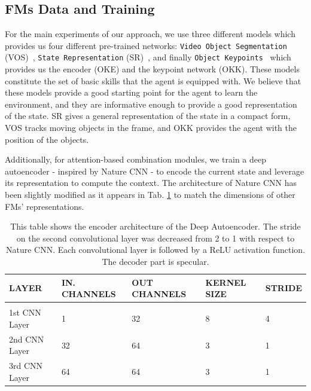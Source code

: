 \subsection{FMs Data and Training}
For the main experiments of our approach, we use three different models which provides us four different pre-trained networks: \texttt{Video Object Segmentation} (VOS)~\citep{goel2018unsupervised}, \texttt{State Representation} (SR)~\citep{anand2019unsupervised}, and finally \texttt{Object Keypoints}~\citep{kulkarni2019unsupervised} which provides us the encoder (OKE) and the keypoint network (OKK).
These models constitute the set of basic skills that the agent is equipped with.
We believe that these models provide a good starting point for the agent to learn the environment, and they are informative enough to provide a good representation of the state.
SR gives a general representation of the state in a compact form, VOS tracks moving objects in the frame, and OKK provides the agent with the position of the objects.

Additionally, for attention-based combination modules, we train a deep autoencoder - inspired by Nature CNN \citep{mnih2015human} - to encode the current state and leverage its representation to compute the context.
The architecture of Nature CNN has been slightly modified as it appears in Tab. \ref{tab:nature_cnn} to
match the dimensions of other FMs' representations.

 \begin{table}[htbp]
     \begin{center}
         \begin{tabular}{lllll}
             \multicolumn{1}{l}{LAYER}  &\multicolumn{1}{l}{\bf IN. CHANNELS}  &\multicolumn{1}{l}{\bf OUT CHANNELS}  &\multicolumn{1}{l}{\bf KERNEL SIZE}  &\multicolumn{1}{l}{\bf STRIDE}
             \\ \hline \\
             1st CNN Layer   &  1  & 32 & 8 & 4 \\
             2nd CNN Layer   &  32  & 64 & 3 & 1 \\
             3rd CNN Layer   &  64  & 64 & 3 & 1 \\

         \end{tabular}
     \end{center}
     \caption{This table shows the encoder architecture of the Deep Autoencoder. The stride on the second convolutional layer was decreased from 2 to 1 with respect to Nature CNN. Each convolutional layer is followed by a ReLU activation function. The decoder part is specular.}
     \label{tab:nature_cnn}
 \end{table}


